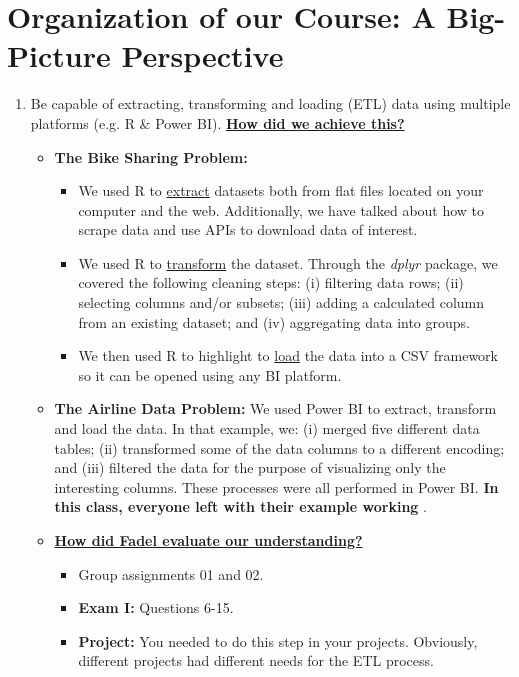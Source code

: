 \documentclass[letterpaper,12pt]{article}
\title{}
\author{}
\date{}
\begin{document}
\section*{Organization of our Course: A Big-Picture Perspective}
\begin{enumerate}[label=(\Alph*)]
	\item Be capable of extracting, transforming and loading (ETL) data using multiple platforms (e.g. R \& Power BI). \underline{\textbf{\textbf{How did we achieve this?}}}
	\begin{itemize}[nosep]
		\item \textbf{The Bike Sharing Problem:} 
		\begin{itemize}[nosep]
			\item We used R to \ul{extract} datasets both from flat files located on your computer and the web. Additionally, we have talked about how to scrape data and use APIs to download data of interest.
			\item We used R to \ul{transform} the dataset. Through the \textit{dplyr} package, we covered the following cleaning steps: (i) filtering data rows; (ii) selecting columns and/or subsets; (iii) adding a calculated column from an existing dataset; and (iv) aggregating data into groups.
			\item We then used R to highlight to \ul{load} the data into a CSV framework so it can be opened using any BI platform.
		\end{itemize}
		\item \textbf{The Airline Data Problem:} We used Power BI to extract, transform and load the data. In that example, we: (i) merged five different data tables; (ii) transformed some of the data columns to a different encoding; and (iii) filtered the data for the purpose of visualizing only the interesting columns. These processes were all performed in Power BI. \textbf{In this class, everyone left with their example working \smiley{}}.
		\item \textbf{\ul{How did Fadel evaluate our understanding?}}
		\begin{itemize}[nosep]
			\item Group assignments 01 and 02.
			\item \textbf{Exam I:} Questions 6-15.
			\item \textbf{Project:} You needed to do this step in your projects. Obviously, different projects had different needs for the ETL process.
		\end{itemize}
	\end{itemize}

\end{enumerate}
\end{document}
